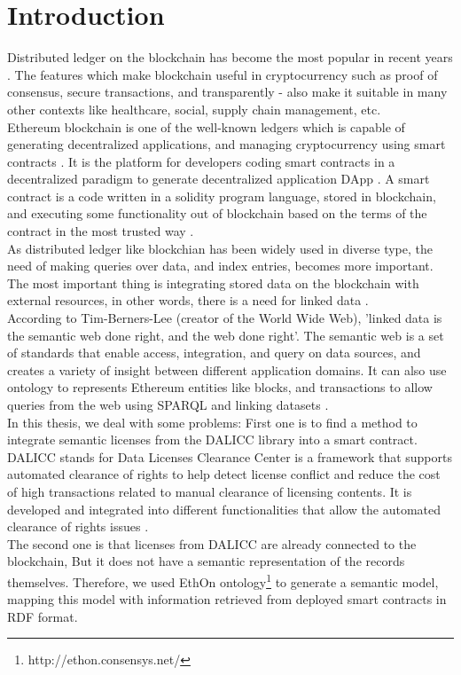 \section{Introduction}
Distributed ledger on the blockchain has become the most popular in recent years \cite{Third}. The features which make blockchain useful in cryptocurrency such as proof of consensus, secure transactions, and transparently - also make it suitable in many other contexts like healthcare, social, supply chain management, etc. \\
Ethereum blockchain is one of the well-known ledgers which is capable of generating decentralized applications, and managing cryptocurrency using smart contracts \cite{Third}. It is the platform for developers coding smart contracts in a decentralized paradigm to generate decentralized application DApp \cite{William}. 
A smart contract is a code written in a solidity program language, stored in blockchain, and executing some functionality out of blockchain based on the terms of the contract in the most trusted way \cite{Third}. \\
As distributed ledger like blockchian has been widely used in diverse type, the need of making queries over data, and index entries, becomes more important. The most important thing is integrating stored data on the blockchain with external resources, in other words, there is a need for linked data \cite{Third}. \\
According to Tim-Berners-Lee (creator of the World Wide Web), 'linked data is the semantic web done right, and the web done right'\cite{Hector}. 
 The semantic web is a set of standards that enable access, integration, and query on data sources, and creates a variety of insight between different application domains. It can also use ontology to represents Ethereum entities like blocks, and transactions to allow queries from the web using SPARQL and linking datasets \cite{Third}. \\
In this thesis, we deal with some problems: First one is to find a method to integrate semantic licenses from the DALICC library into a smart contract. 
DALICC stands for Data Licenses Clearance Center is a framework that supports automated clearance of rights to help detect license conflict and reduce the cost of high transactions related to manual clearance of licensing contents.
It is developed and integrated into different functionalities that allow the automated clearance of rights issues \cite{Anna}.\\
The second one is that licenses from DALICC are already connected to the blockchain, But it does not have a semantic representation of the records themselves. Therefore, we used EthOn ontology\footnote{http://ethon.consensys.net/} to generate a semantic model, mapping this model with information retrieved from deployed smart contracts in RDF format. \\
